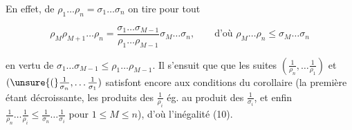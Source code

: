En effet, de $\rho_1\ldots\rho_n=\sigma_1\ldots\sigma_n$ on tire pour tout 

\[
\rho_M\rho_{M+1}\ldots\rho_n=\frac{\sigma_1\ldots\sigma_{M-1}}{\rho_1\ldots\rho_{M-1}}\sigma_M\ldots\sigma_n,\qquad\text{d'où }\rho_M\ldots\rho_n\leq\sigma_M\ldots\sigma_n
\]

en vertu de $\sigma_1\ldots\sigma_{M-1}\leq\rho_1\ldots\rho_{M-1}$. Il s'ensuit que que les suites $(\frac1{\rho_n},\ldots\frac1{\rho_1})$ et $(\unsure{(}\frac1{\sigma_n},\ldots\frac1{\sigma_1})$ satisfont encore aux conditions du corollaire (la première étant décroissante, les produits  des $\frac1{\rho_i}$ ég. au produit des $\frac1{\sigma_i}$, et enfin $\frac1{\rho_n}\ldots\frac1{\rho_i}\leq\frac1{\sigma_n}\ldots\frac1{\sigma_i}$ pour $1\leq M\leq n$), d'où l'inégalité (10).

